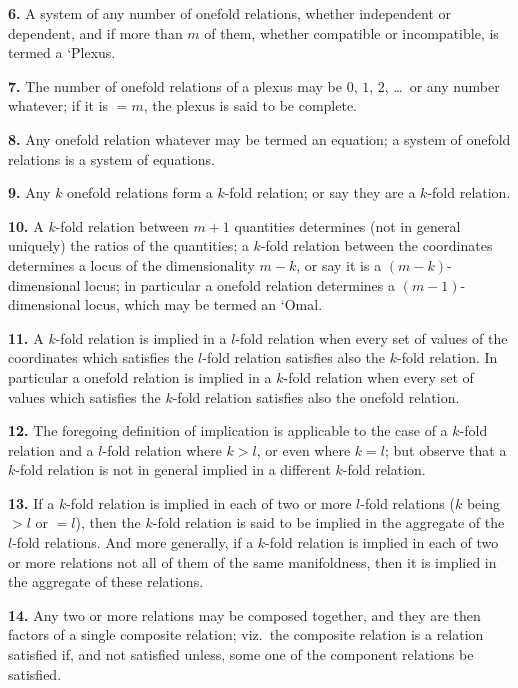 \documentclass[11pt,a4paper]{article}
\theoremstyle{definition}
\begin{document}
\noindent\textbf{6.} A system of any number of onefold relations, whether independent or dependent, and if more than $m$ of them, whether compatible or incompatible, is termed a `Plexus.

\noindent\textbf{7.} The number of onefold relations of a plexus may be $0$, $1$, $2$, \ldots\ or any number whatever; if it is $=m$, the plexus is said to be complete.

\noindent\textbf{8.} Any onefold relation whatever may be termed an equation; a system of onefold relations is a system of equations.

\noindent\textbf{9.} Any $k$ onefold relations form a $k$-fold relation; or say they are a $k$-fold relation.

\noindent\textbf{10.} A $k$-fold relation between $m+1$ quantities determines (not in general uniquely) the ratios of the quantities; a $k$-fold relation between the coordinates determines a locus of the dimensionality $m-k$, or say it is a $(m-k)$-dimensional locus; in particular a onefold relation determines a $(m-1)$-dimensional locus, which may be termed an `Omal.

\noindent\textbf{11.} A $k$-fold relation is implied in a $l$-fold relation when every set of values of the coordinates which satisfies the $l$-fold relation satisfies also the $k$-fold relation. In particular a onefold relation is implied in a $k$-fold relation when every set of values which satisfies the $k$-fold relation satisfies also the onefold relation.

\noindent\textbf{12.} The foregoing definition of implication is applicable to the case of a $k$-fold relation and a $l$-fold relation where $k>l$, or even where $k=l$; but observe that a $k$-fold relation is not in general implied in a different $k$-fold relation.

\noindent\textbf{13.} If a $k$-fold relation is implied in each of two or more $l$-fold relations ($k$ being $>l$ or $=l$), then the $k$-fold relation is said to be implied in the aggregate of the $l$-fold relations. And more generally, if a $k$-fold relation is implied in each of two or more relations not all of them of the same manifoldness, then it is implied in the aggregate of these relations.

\setcounter{page}{457}

\noindent\textbf{14.} Any two or more relations may be composed together, and they are then factors of a single composite relation; viz.\ the composite relation is a relation satisfied if, and not satisfied unless, some one of the component relations be satisfied.
\end{document}
